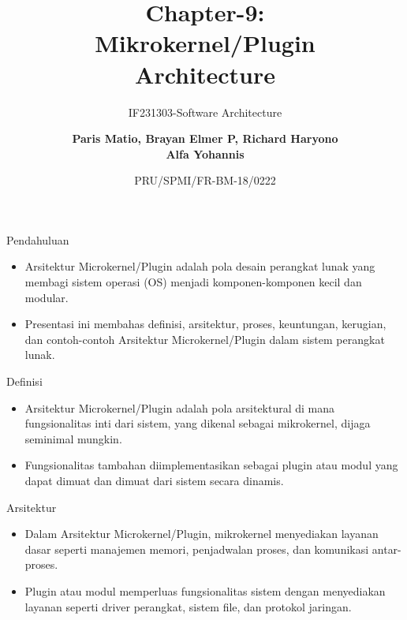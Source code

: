 \documentclass[aspectratio=169, table]{beamer}
\subtitle{IF231303-Software Architecture}
\title{\huge Chapter-9:\\Mikrokernel/Plugin\\Architecture}
\date[Serial]{\scriptsize {PRU/SPMI/FR-BM-18/0222}}
\author[Pradita]{\small {\textbf{Paris Matio, Brayan Elmer P, Richard Haryono\\ Alfa Yohannis}}}
\begin{document}
    \begin{frame}[plain]
        \maketitle
    \end{frame}

    \begin{frame}{Pendahuluan}
        \begin{itemize}
            \item Arsitektur Microkernel/Plugin adalah pola desain perangkat lunak yang membagi sistem operasi (OS) menjadi komponen-komponen kecil dan modular.
            \item Presentasi ini membahas definisi, arsitektur, proses, keuntungan, kerugian, dan contoh-contoh Arsitektur Microkernel/Plugin dalam sistem perangkat lunak.
        \end{itemize}
    \end{frame}

    \begin{frame}{Definisi}
        \begin{itemize}
            \item Arsitektur Microkernel/Plugin adalah pola arsitektural di mana fungsionalitas inti dari sistem, yang dikenal sebagai mikrokernel, dijaga seminimal mungkin.
            \item Fungsionalitas tambahan diimplementasikan sebagai plugin atau modul yang dapat dimuat dan dimuat dari sistem secara dinamis.
        \end{itemize}
    \end{frame}

    \begin{frame}{Arsitektur}
        \begin{itemize}
            \item Dalam Arsitektur Microkernel/Plugin, mikrokernel menyediakan layanan dasar seperti manajemen memori, penjadwalan proses, dan komunikasi antar-proses.
            \item Plugin atau modul memperluas fungsionalitas sistem dengan menyediakan layanan seperti driver perangkat, sistem file, dan protokol jaringan.
        \end{itemize}
    \end{frame}
\end{document}
